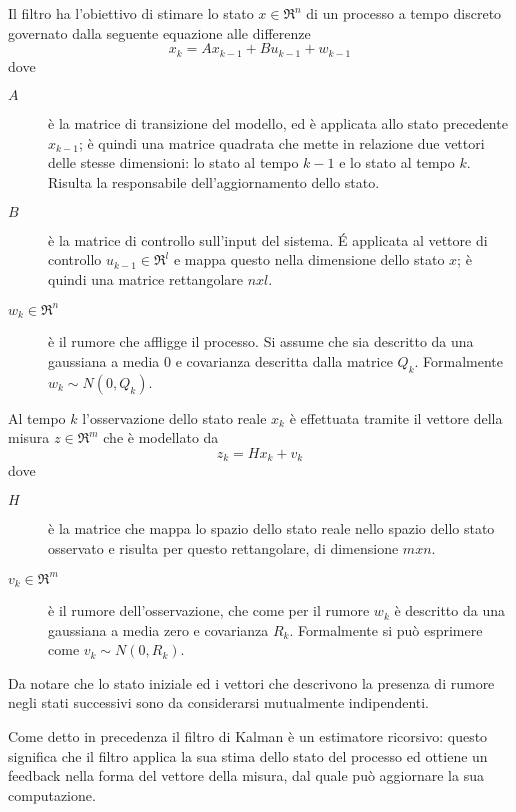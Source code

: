 Il filtro ha l'obiettivo di stimare lo stato $x \in \Re^n$ di un processo a tempo discreto governato dalla seguente equazione alle differenze
\begin{equation}\label{eq:x}
 x_k=Ax_{k-1}+Bu_{k-1}+w_{k-1}
\end{equation} 
dove 
\begin{description}
 \item [$A$] è la matrice di transizione del modello, ed è applicata allo stato precedente $x_{k-1}$; è quindi una matrice quadrata che mette in relazione due vettori delle stesse dimensioni: lo stato al tempo $k-1$ e lo stato al tempo $k$. Risulta la responsabile dell'aggiornamento dello stato.
\item [$B$] è la matrice di controllo sull'input del sistema. \'E applicata al vettore di controllo $u_{k-1} \in \Re^l$ e mappa questo nella dimensione dello stato $x$; è quindi una matrice rettangolare $nxl$.
\item [$w_k \in \Re^n$] è il rumore che affligge il processo. Si assume che sia descritto da una gaussiana a media $0$ e covarianza descritta dalla matrice $Q_k$. Formalmente $w_k \sim N(0,Q_k)$.
\end{description}

Al tempo $k$ l'osservazione dello stato reale $x_k$ è effettuata tramite il vettore della misura $z \in \Re^m$ che è modellato da
\begin{equation}\label{eq:z}
z_k=Hx_k+v_k
\end{equation}
dove 
\begin{description}
 \item [$H$] è la matrice che mappa lo spazio dello stato reale nello spazio dello stato osservato e risulta per questo rettangolare, di dimensione $mxn$.
\item [$v_k \in \Re^m$] è il rumore dell'osservazione, che come per il rumore $w_k$ è descritto da una gaussiana a media zero e covarianza $R_k$. Formalmente si può esprimere come $v_k \sim N(0,R_k)$.
\end{description}
 Da notare che lo stato iniziale ed i vettori che descrivono la presenza di rumore negli stati successivi sono da considerarsi mutualmente indipendenti.

Come detto in precedenza il filtro di Kalman è un estimatore ricorsivo: questo significa che il filtro applica la sua stima dello stato del processo ed ottiene un feedback nella forma del vettore della misura, dal quale può aggiornare la sua computazione. 

